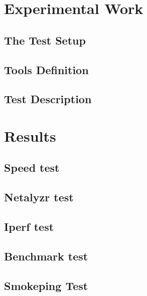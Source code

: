\documentclass[letter, 11pt]{article}
\begin{document}
\newpage

\section{Experimental Work}


\subsection{The Test Setup}


\subsection{Tools Definition}


\subsection{Test Description}


\newpage
\section{Results}


\subsection{Speed test}


\subsection{Netalyzr test}


\subsection{Iperf test}


\subsection{Benchmark test}


\subsection{Smokeping Test}

\end{document}
